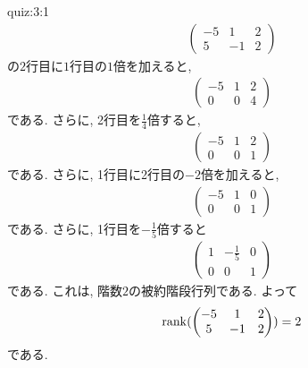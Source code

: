 \begin{answerof}{quiz:3:1}
  \begin{align*}
    \begin{pmatrix}
      -5&1&2\\5&-1&2
    \end{pmatrix}
  \end{align*}
  の$2$行目に$1$行目の$1$倍を加えると,
  \begin{align*}
    \begin{pmatrix}
      -5&1&2\\0&0&4
    \end{pmatrix}
  \end{align*}
  である. さらに, 
  2行目を$\frac{1}{4}$倍すると,
  \begin{align*}
    \begin{pmatrix}
      -5&1&2\\0&0&1
    \end{pmatrix}
  \end{align*}
  である. さらに,
  1行目に2行目の$-2$倍を加えると,
  \begin{align*}
    \begin{pmatrix}
      -5&1&0\\0&0&1
    \end{pmatrix}
  \end{align*}
  である. さらに,
  1行目を$-\frac{1}{5}$倍すると
  \begin{align*}
    \begin{pmatrix}
      1&-\frac{1}{5}&0\\0&0&1
    \end{pmatrix}
  \end{align*}
  である.
  これは, 階数$2$の被約階段行列である.
  よって
  \begin{align*}
    \operatorname{rank}(
    \begin{pmatrix}
      -5&1&2\\5&-1&2
    \end{pmatrix}
    )=2
  \end{align*}
  である.



\end{answerof}

